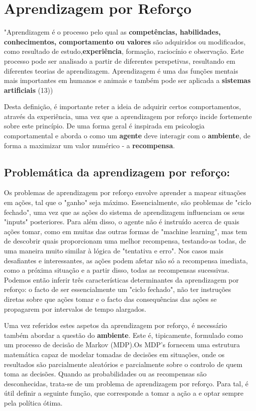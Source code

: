 \section{Aprendizagem por Reforço}\label{sec:ReinforcementLearning}


"Aprendizagem é o processo pelo qual as \textbf{competências, habilidades, conhecimentos, comportamento ou valores} são adquiridos ou modificados, como resultado de estudo,\textbf{experiência}, formação, raciocínio e observação. Este processo pode ser analisado a partir de diferentes perspetivas, resultando em diferentes teorias de aprendizagem.
Aprendizagem é uma das funções mentais mais importantes em humanos e animais e também pode ser aplicada a \textbf{sistemas artificiais} (13))    

Desta definição, é importante reter a ideia de adquirir certos comportamentos, através da experiência, uma vez que a aprendizagem por reforço incide fortemente sobre este princípio. De uma forma geral é inspirada em psicologia comportamental e aborda o como um \textbf{agente} deve interagir com o \textbf{ambiente}, de forma a maximizar um valor numérico - a \textbf{recompensa}.

\subsection{Problemática da aprendizagem por reforço:}

Os problemas de aprendizagem por reforço envolve aprender a mapear situações em ações, tal que o "ganho" seja máximo. Essencialmente, são problemas de "ciclo fechado", uma vez que as ações do sistema de aprendizagem influenciam os seus "inputs" posteriores. Para além disso, o agente não é instruído acerca de quais ações tomar, como em muitas das outras formas de "machine learning", mas tem de descobrir quais proporcionam uma melhor recompensa, testando-as todas, de uma maneira muito similar à lógica de "tentativa e erro". Nos casos mais desafiantes e interessantes, as ações podem afetar não só a recompensa imediata, como a próxima situação e a partir disso, todas as recompensas sucessivas. Podemos então inferir três características determinantes da aprendizagem por reforço: o facto de ser essencialmente um "ciclo fechado", não ter instruções diretas sobre que ações tomar e o facto das consequências das ações se propagarem por intervalos de tempo alargados.

Uma vez referidos estes aspetos da aprendizagem por reforço, é necessário também abordar a questão do \textbf{ambiente}. Este é, tipicamente, formulado como um processo de decisão de Markov (MDP).Os MDP's fornecem uma estrutura matemática capaz de modelar tomadas de decisões em situações, onde os resultados são parcialmente aleatórios e parcialmente sobre o controlo de quem toma as decisões. Quando as probabilidades ou as recompensas são desconhecidas, trata-se de um problema de aprendizagem por reforço. Para tal, é útil definir a seguinte função, que corresponde a tomar a ação a e optar sempre pela política ótima.


